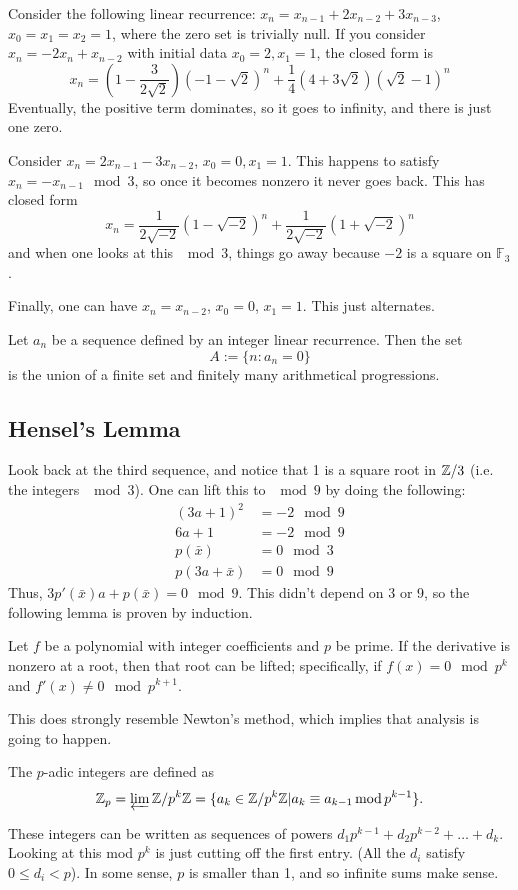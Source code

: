 \label{skolem}
Consider the following linear recurrence: $x_n = x_{n-1} +2x_{n-2} +3x_{n-3}$,$x_0=x_1=x_2=1$, where the zero set is trivially null. If you consider $x_n = -2x_n +x_{n-2}$ with initial data $x_0=2,x_1=1$, the closed form is
\[x_n = \left(1-\frac{3}{2\sqrt 2}\right)(-1-\sqrt 2)^n +\frac{1}{4}(4+3\sqrt 2)(\sqrt 2 - 1)^n\]
Eventually, the positive term dominates, so it goes to infinity, and there is just one zero.

Consider $x_n = 2x_{n-1}-3x_{n-2}$, $x_0=0,x_1=1$. This happens to satisfy $x_n = -x_{n-1}\mod 3$, so once it becomes nonzero it never goes back. This has closed form
\[x_n = \frac{1}{2\sqrt{-2}}(1-\sqrt{-2})^n +\frac{1}{2\sqrt{-2}}(1+\sqrt{-2})^n\]
and when one looks at this $\mod 3$, things go away because $-2$ is a square on $\mathbb{F}_3$.

Finally, one can have $x_n=x_{n-2}$, $x_0=0$, $x_1=1$. This just alternates.

\begin{thm}
Let $a_n$ be a sequence defined by an integer linear recurrence. Then the set
\[A := \{n:a_n = 0\}\]
is the union of a finite set and finitely many arithmetical progressions.
\end{thm}
\subsection{Hensel's Lemma}
Look back at the third sequence, and notice that 1 is a square root in $\mathbb{Z}/3$ (i.e. the integers $\mod 3$). One can lift this to $\mod 9$ by doing the following:
\begin{align*}
(3a+1)^2 &= -2\mod 9\\
6a+1 &= -2\mod 9\\
p(\bar x) &= 0\mod 3\\
p(3a+\bar x) &= 0\mod 9
\end{align*}
Thus, $3p'(\bar x)a + p(\bar x) = 0\mod 9$. This didn't depend on 3 or 9, so the following lemma is proven by induction.
\begin{lem}[Hensel]
Let $f$ be a polynomial with integer coefficients and $p$ be prime. If the derivative is nonzero at a root, then that root can be lifted; specifically, if $f(x) = 0\mod p^k$ and $f'(x) \ne 0\mod p^{k+1}$. %
\end{lem}
This does strongly resemble Newton's method, which implies that analysis is going to happen.
\begin{defn}
The $p$-adic integers are defined as 
\[\mathbb{Z}_p = \varprojlim \mathbb{Z}/p^k\mathbb{Z} = \{a_k\in\mathbb{Z}/p^k\mathbb{Z} | a_k \equiv a_{k-1}\operatorname{mod} p^{k-1}\}.\]
\end{defn}
These integers can be written as sequences of powers $d_1p^{k-1}+d_2p^{k-2}+\dots+d_k$. Looking at this mod $p^k$ is just cutting off the first entry. (All the $d_i$ satisfy $0\le d_i<p$). In some sense, $p$ is smaller than 1, and so infinite sums make sense.

